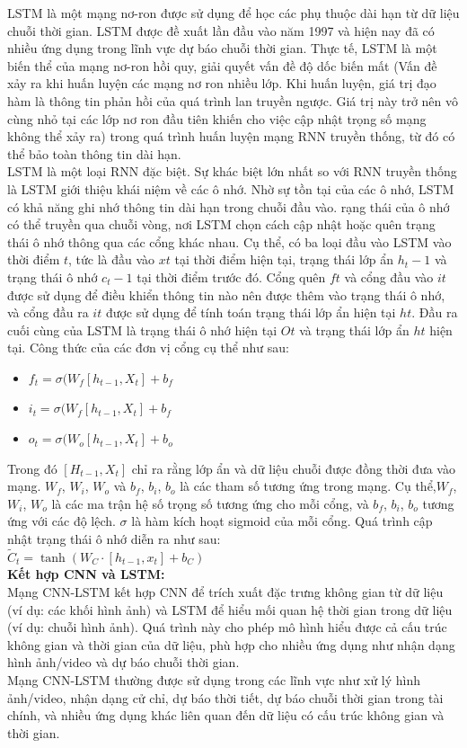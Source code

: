 \documentclass[conference]{IEEEtran}
\begin{document}
	LSTM là một mạng nơ-ron được sử dụng để học các phụ thuộc dài hạn từ dữ liệu chuỗi thời gian. LSTM được đề xuất lần đầu vào năm 1997 và hiện nay đã có nhiều ứng dụng trong lĩnh vực dự báo chuỗi thời gian. Thực tế, LSTM là một biến thể của mạng nơ-ron hồi quy, giải quyết vấn đề độ dốc biến mất (Vấn đề xảy ra khi huấn luyện các mạng nơ ron nhiều lớp. Khi huấn luyện, giá trị đạo hàm là thông tin phản hồi của quá trình lan truyền ngược. Giá trị này trở nên vô cùng nhỏ tại các lớp nơ ron đầu tiên khiến cho việc cập nhật trọng số mạng không thể xảy ra) trong quá trình huấn luyện mạng RNN truyền thống, từ đó có thể bảo toàn thông tin dài hạn.\\
	LSTM là một loại RNN đặc biệt. Sự khác biệt lớn nhất so với RNN truyền thống là LSTM giới thiệu khái niệm về các ô nhớ. Nhờ sự tồn tại của các ô nhớ, LSTM có khả năng ghi nhớ thông tin dài hạn trong chuỗi đầu vào. rạng thái của ô nhớ có thể truyền qua chuỗi vòng, nơi LSTM chọn cách cập nhật hoặc quên trạng thái ô nhớ thông qua các cổng khác nhau. Cụ thể, có ba loại đầu vào LSTM vào thời điểm $t$, tức là đầu vào $xt$ tại thời điểm hiện tại, trạng thái lớp ẩn $h_{t}-1$ và trạng thái ô nhớ $c_{t}-1$ tại thời điểm trước đó. Cổng quên $ft$ và cổng đầu vào $it$ được sử dụng để điều khiển thông tin nào nên được thêm vào trạng thái ô nhớ, và cổng đầu ra $it$ được sử dụng để tính toán trạng thái lớp ẩn hiện tại $ht$. Đầu ra cuối cùng của LSTM là trạng thái ô nhớ hiện tại $Ot$ và trạng thái lớp ẩn $ht$ hiện tại. Công thức của các đơn vị cổng cụ thể như sau:\\
	\begin{itemize}
		\item $f_{t} = \sigma(W_{f}[h_{t-1}, X_{t}] + b_{f}$
		
		\item $i_{t} = \sigma(W_{f}[h_{t-1}, X_{t}] + b_{f}$
		
		\item $o_{t} = \sigma(W_{o}[h_{t-1}, X_{t}] + b_{o}$
	\end{itemize}
	Trong đó $[H_{t-1}, X_{t}]$ chỉ ra rằng lớp ẩn và dữ liệu chuỗi được đồng thời đưa vào mạng. $W_{f}$, $W_{i}$, $W_{o}$ và $b_{f}$, $b_{i}$, $b_{o}$ là các tham số tương ứng trong mạng. Cụ thể,$W_{f}$, $W_{i}$, $W_{o}$ là các ma trận hệ số trọng số tương ứng cho mỗi cổng, và $b_{f}$, $b_{i}$, $b_{o}$ tương ứng với các độ lệch. $\sigma$ là hàm kích hoạt sigmoid của mỗi cổng. Quá trình cập nhật trạng thái ô nhớ diễn ra như sau:\\
	
	$\tilde{C}_t = \tanh(W_C \cdot [h_{t-1}, x_t] + b_C)$\\
	\textbf{Kết hợp CNN và LSTM:}\\
	Mạng CNN-LSTM kết hợp CNN để trích xuất đặc trưng không gian từ dữ liệu (ví dụ: các khối hình ảnh) và LSTM để hiểu mối quan hệ thời gian trong dữ liệu (ví dụ: chuỗi hình ảnh). Quá trình này cho phép mô hình hiểu được cả cấu trúc không gian và thời gian của dữ liệu, phù hợp cho nhiều ứng dụng như nhận dạng hình ảnh/video và dự báo chuỗi thời gian.\\
	Mạng CNN-LSTM thường được sử dụng trong các lĩnh vực như xử lý hình ảnh/video, nhận dạng cử chỉ, dự báo thời tiết, dự báo chuỗi thời gian trong tài chính, và nhiều ứng dụng khác liên quan đến dữ liệu có cấu trúc không gian và thời gian.
\end{document}
